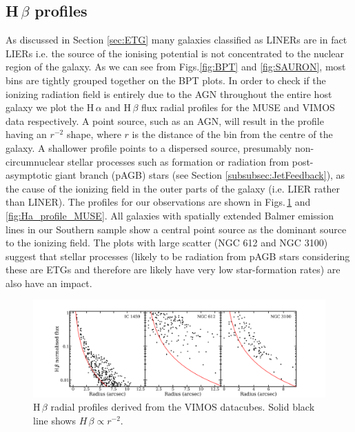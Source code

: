

	\subsection{H\,$\beta$ profiles}
		\label{subsec:Hb}
		As discussed in Section \ref{sec:ETG} many galaxies classified as LINERs are in fact LIERs \citep[e.g.][]{Sarzi2005, Sarzi2010, Singh2013, Belfiore2016} i.e. the source of the ionising potential is not concentrated to the nuclear region of the galaxy. As we can see from Figs.\ref{fig:BPT} and \ref{fig:SAURON}, most bins are tightly grouped together on the BPT plots. In order to check if the ionizing radiation field is entirely due to the AGN throughout the entire host galaxy we plot the H\,$\alpha$ and H\,$\beta$ flux radial profiles for the MUSE and VIMOS data respectively. A point source, such as an AGN, will result in the profile having an $r^{-2}$ shape, where $r$ is the distance of the bin from the centre of the galaxy. A shallower profile points to a dispersed source, presumably non-circumnuclear stellar processes such as formation or radiation from post-asymptotic giant branch (pAGB) stars (see Section \ref{subsubsec:JetFeedback}), as the cause of the ionizing field in the outer parts of the galaxy (i.e. LIER rather than LINER). The profiles for our observations are shown in Figs.\,\ref{fig:Hb_profile_VIMOS} and \ref{fig:Ha_profile_MUSE}. All galaxies with spatially extended Balmer emission lines in our Southern sample show a central point source as the dominant source to the ionizing field. The plots with large scatter (NGC 612 and NGC 3100) suggest that stellar processes (likely to be radiation from pAGB stars considering these are ETGs and therefore are likely have very low star-formation rates) are also have an impact.

		\begin{figure}
			\centering
			\includegraphics[width=\textwidth]{chapter5/vimos/Hbeta_profile.png}
			\caption[VIMOS H\,$\beta$ radial profiles]{H\,$\beta$ radial profiles derived from the VIMOS datacubes. Solid black line shows $H\,\beta \propto r^{-2}$.} 
			\label{fig:Hb_profile_VIMOS}
		\end{figure}

